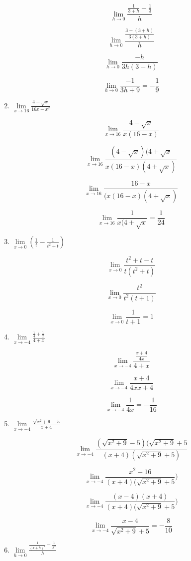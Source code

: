 \documentclass{article}
\begin{document}
\begin{enumerate}
			$$\lim \limits _{h \to 0} \frac{\frac{1}{3+h} - \frac{1}{3}}{h}$$

			$$\lim \limits _{h \to 0} \frac{\frac{3 - (3+h)}{3(3+h)}}{h}$$

			$$\lim \limits _{h \to 0} \frac{-h}{3h(3+h)}$$

			$$\lim \limits _{h \to 0} \frac{-1}{3h + 9} = - \frac{1}{9}$$

		\item $\lim \limits _{x \to 16} \frac{4 - \sqrt{x}}{16x - x^2}$

			$$\lim \limits _{x \to 16} \frac{4-\sqrt{x}}{x(16-x)}$$

			$$\lim \limits _{x \to 16} \frac{(4-\sqrt{x})(4+\sqrt{x}}{x(16-x)(4+\sqrt{x})}$$

			$$\lim \limits _{x \to 16} \frac{16-x}{(x(16-x)(4+\sqrt{x})}$$

			$$\lim \limits _{x \to 16} \frac{1}{x(4+\sqrt{x}} = \frac{1}{24}$$

		\item $\lim \limits _{x \to 0} ( \frac{1}{t} - \frac{1}{t^2 + t})$


			$$\lim \limits _{x \to 0} \frac{t^2 + t - t}{t(t^2+t)}$$

			$$\lim \limits _{x \to 0} \frac{t^2}{t^2(t+1)}$$

			$$\lim \limits _{x \to 0} \frac{1}{t+1} = 1$$

		\item $\lim \limits _{x \to -4} \frac{\frac{1}{4} + \frac{1}{x}}{4+x}$

			$$\lim \limits _{x \to -4} \frac{\frac{x+4}{4x}}{4+x}$$

			$$\lim \limits _{x \to -4} \frac{x+4}{4x{x+4}}$$

			$$\lim \limits _{x \to -4} \frac{1}{4x} = -\frac{1}{16}$$

		\item $\lim \limits _{x \to -4} \frac{\sqrt{x^2 + 9} - 5}{x+4}$

			$$\lim \limits _{x \to -4} \frac{(\sqrt{x^2+9}-5)(\sqrt{x^2+9}+5}{(x+4)(\sqrt{x^2+9}+5)}$$

			$$\lim \limits _{x \to -4} \frac{x^2-16}{(x+4)(\sqrt{x^2+9}+5})$$

			$$\lim \limits _{x \to -4} \frac{(x-4)(x+4)}{(x+4)(\sqrt{x^2+9}+5})$$

			$$\lim \limits _{x \to -4} \frac{x-4}{\sqrt{x^2+9}+5} = - \frac{8}{10}$$

		\item $\lim \limits _{h \to 0} \frac{\frac{1}{(x+h)^2}-\frac{1}{x^2}}{h}$


\end{enumerate}
\end{document}
